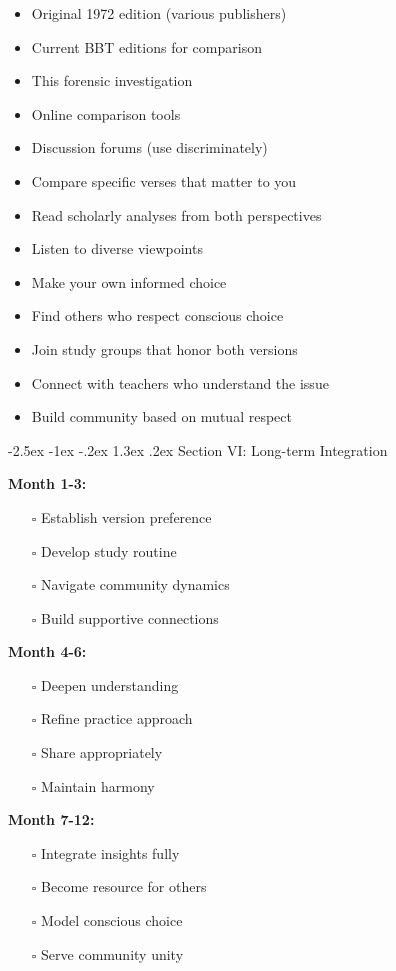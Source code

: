 \documentclass[12pt,twoside]{book}
\makeatletter
\renewcommand\section{\@startsection{section}{1}{\z@}%
{-2.5ex \@plus -1ex \@minus -.2ex}%
{1.3ex \@plus.2ex}%
{\normalfont\Large\bfseries}}
\makeatother
\begin{document}
\begin{itemize}
\item Original 1972 edition (various publishers)
\item Current BBT editions for comparison
\item This forensic investigation
\item Online comparison tools
\item Discussion forums (use discriminately)

\item Compare specific verses that matter to you
\item Read scholarly analyses from both perspectives
\item Listen to diverse viewpoints
\item Make your own informed choice

\item Find others who respect conscious choice
\item Join study groups that honor both versions
\item Connect with teachers who understand the issue
\item Build community based on mutual respect
\end{itemize}
\section{Section VI: Long-term Integration}
\label{sec:org262d8e6}

\textbf{\textbf{Month 1-3:}}
\begin{itemize}
\item[{$\square$}] Establish version preference
\item[{$\square$}] Develop study routine
\item[{$\square$}] Navigate community dynamics
\item[{$\square$}] Build supportive connections
\end{itemize}

\textbf{\textbf{Month 4-6:}}
\begin{itemize}
\item[{$\square$}] Deepen understanding
\item[{$\square$}] Refine practice approach
\item[{$\square$}] Share appropriately
\item[{$\square$}] Maintain harmony
\end{itemize}

\textbf{\textbf{Month 7-12:}}
\begin{itemize}
\item[{$\square$}] Integrate insights fully
\item[{$\square$}] Become resource for others
\item[{$\square$}] Model conscious choice
\item[{$\square$}] Serve community unity
\end{itemize}
\end{document}
